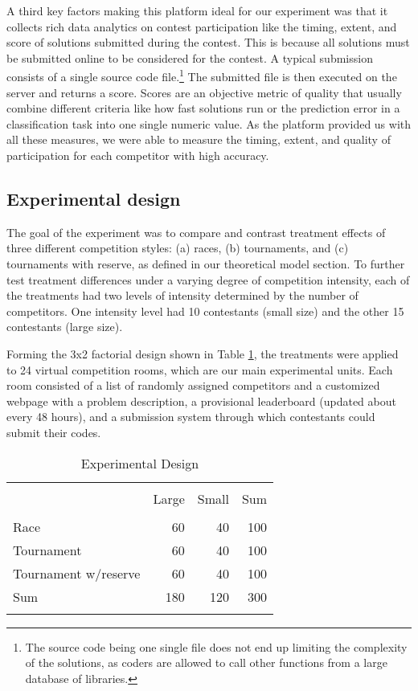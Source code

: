 \documentclass[10pt, titlepage]{article}
\begin{document}
A third key factors making this platform ideal for our experiment was
that it collects rich data analytics on contest participation like the
timing, extent, and score of solutions submitted during the contest.
This is because all solutions must be submitted online to be considered
for the contest. A typical submission consists of a single source code
file.\footnote{The source code being one single file does not end up
  limiting the complexity of the solutions, as coders are allowed to
  call other functions from a large database of libraries.} The
submitted file is then executed on the server and returns a score.
Scores are an objective metric of quality that usually combine different
criteria like how fast solutions run or the prediction error in a
classification task into one single numeric value. As the platform
provided us with all these measures, we were able to measure the timing,
extent, and quality of participation for each competitor with high
accuracy.

\subsection{Experimental design}\label{experimental-design}

The goal of the experiment was to compare and contrast treatment effects
of three different competition styles: (a) races, (b) tournaments, and
(c) tournaments with reserve, as defined in our theoretical model
section. To further test treatment differences under a varying degree of
competition intensity, each of the treatments had two levels of
intensity determined by the number of competitors. One intensity level
had 10 contestants (small size) and the other 15 contestants (large
size).

Forming the 3x2 factorial design shown in Table
\ref{experimental design}, the treatments were applied to 24 virtual
competition rooms, which are our main experimental units. Each room
consisted of a list of randomly assigned competitors and a customized
webpage with a problem description, a provisional leaderboard (updated
about every 48 hours), and a submission system through which contestants
could submit their codes.

\begin{table}
\centering
\caption{Experimental Design}
\label{experimental design}
\begin{tabular}{@{}lrrr}
  \\[-1.8ex]\hline\hline\\[-1.8ex]
 & Large & Small & Sum \\ 
  \hline\\[-1.86ex]
Race & 60 & 40 & 100 \\ 
  Tournament & 60 & 40 & 100 \\ 
  Tournament w/reserve & 60 & 40 & 100 \\ 
  Sum & 180 & 120 & 300 \\ 
   \hline\\[-1.8ex]
\end{tabular}
\end{table}
\end{document}

